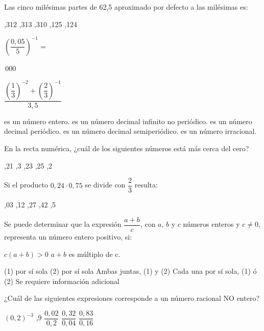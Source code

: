 \documentclass[pagina vacia]{srs}
\begin{document}
\begin{preguntas}[after-item-skip=1cm]
\pregunta Las cinco milésimas partes de 62,5 aproximado por defecto a las milésimas es:
\begin{vertical}
,312
,313
,310
,125
,124
\end{vertical}

\pregunta \( \left(\dfrac{0,05}{5}\right)^{-1} = \)
\begin{vertical}
\,000
\end{vertical}

\pregunta \( \dfrac{\left(\dfrac{1}{3}\right)^{-2} + \left(\dfrac{2}{3}\right)^{-1}}{3,5} \)
\begin{vertical}
\alternativa es un número entero.
\alternativa es un número decimal infinito no periódico.
\alternativa es un número decimal periódico.
\alternativa es un número decimal semiperiódico.
\alternativa es un número irracional.
\end{vertical}

\pregunta En la recta numérica, ¿cuál de los siguientes números está más cerca del cero?
\begin{vertical}
,21
,3
,23
,25
,2
\end{vertical}

\pregunta Si el producto \(0,24 \cdot 0,75\) se divide con \(\dfrac{2}{3}\) resulta:
\begin{vertical}
,03
,12
,27
,42
,5
\end{vertical}

\pregunta Se puede determinar que la expresión \(\dfrac{a+b}{c}\), con $a$, $b$ y $c$ números enteros
y \(c \neq 0\), representa un número entero positivo, si:
\begin{verticaln}
\alternativa \(c\left(a + b\right)>0\)
\alternativa \(a + b\) es múltiplo de c.
\end{verticaln}
\begin{vertical}
\alternativa (1) por sí sola
\alternativa (2) por sí sola
\alternativa Ambas juntas, (1) y (2)
\alternativa Cada una por sí sola, (1) ó (2)
\alternativa Se requiere información adicional
\end{vertical}

\pregunta ¿Cuál de las siguientes expresiones corresponde a un número racional NO entero?
\begin{vertical}
\alternativa \( (0,2)^{-3} \)
,9
\alternativa \( \dfrac{0,02}{0,2} \)
\alternativa \( \dfrac{0,32}{0,04} \)
\alternativa \( \dfrac{0,83}{0,16} \)
\end{vertical}


\end{preguntas}
\end{document}
